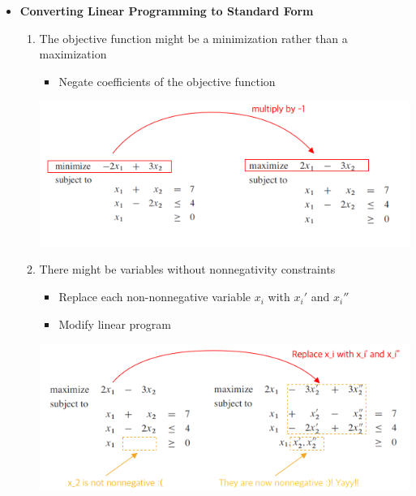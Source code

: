 \documentclass[12pt]{article}
\begin{document}
\begin{enumerate}[1.]
\begin{itemize}
        \item \textbf{Converting Linear Programming to Standard Form}

        \begin{enumerate}[1)]
            \item The objective function might be a minimization rather than a maximization

            \begin{itemize}
                \item Negate coefficients of the objective function
            \end{itemize}

            \begin{center}
            \includegraphics[width=0.9\linewidth]{images/worksheet_6_solution_2.png}
            \end{center}

            \item There might be variables without nonnegativity constraints

            \begin{itemize}
                \item Replace each non-nonnegative variable $x_i$ with $x_i'$ and $x_i''$
                \item Modify linear program
            \end{itemize}

            \begin{center}
            \includegraphics[width=0.9\linewidth]{images/worksheet_6_solution_3.png}
            \end{center}


\end{enumerate}
\end{itemize}
\end{enumerate}
\end{document}
